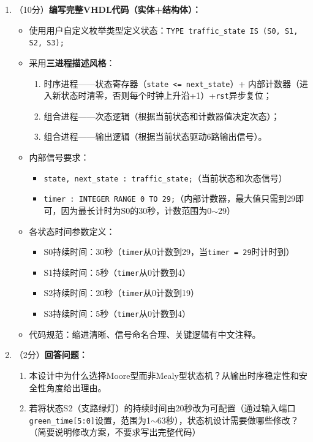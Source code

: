 \begin{enumerate}[label=(\arabic*)]
  \item （10分）\textbf{编写完整VHDL代码（实体+结构体）：}
  \begin{itemize}
    \item 使用用户自定义枚举类型定义状态：\texttt{TYPE traffic\_state IS (S0, S1, S2, S3);}
    \item 采用\textbf{三进程描述风格}：
    \begin{enumerate}
      \item[进程1:] 时序进程——状态寄存器（\texttt{state <= next\_state}）+ 内部计数器（进入新状态时清零，否则每个时钟上升沿+1）+\texttt{rst}异步复位；
      \item[进程2:] 组合进程——次态逻辑（根据当前状态和计数器值决定次态）；
      \item[进程3:] 组合进程——输出逻辑（根据当前状态驱动6路输出信号）。
    \end{enumerate}
    \item 内部信号要求：
    \begin{itemize}
      \item \texttt{state, next\_state : traffic\_state;}（当前状态和次态信号）
      \item \texttt{timer : INTEGER RANGE 0 TO 29;}（内部计数器，最大值只需到29即可，因为最长计时为S0的30秒，计数范围为0$\sim$29）
    \end{itemize}
    \item 各状态时间参数定义：
    \begin{itemize}
      \item S0持续时间：30秒（\texttt{timer}从0计数到29，当\texttt{timer = 29}时计时到）
      \item S1持续时间：5秒（\texttt{timer}从0计数到4）
      \item S2持续时间：20秒（\texttt{timer}从0计数到19）
      \item S3持续时间：5秒（\texttt{timer}从0计数到4）
    \end{itemize}
    \item 代码规范：缩进清晰、信号命名合理、关键逻辑有中文注释。
  \end{itemize}

  \item （2分）\textbf{回答问题：}
  \begin{enumerate}
    \item 本设计中为什么选择Moore型而非Mealy型状态机？从输出时序稳定性和安全性角度给出理由。
    \item 若将状态S2（支路绿灯）的持续时间由20秒改为可配置（通过输入端口\texttt{green\_time[5:0]}设置，范围为1$\sim$63秒），状态机设计需要做哪些修改？（简要说明修改方案，不要求写出完整代码）
  \end{enumerate}
\end{enumerate}

